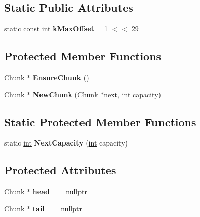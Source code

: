 \subsection*{Static Public Attributes}
\begin{DoxyCompactItemize}
\item 
\mbox{\label{classv8_1_1internal_1_1TypedSlots_a0707d5403da240a6561a9262a7785c83}} 
static const \mbox{\hyperlink{classint}{int}} {\bfseries k\+Max\+Offset} = 1 $<$$<$ 29
\end{DoxyCompactItemize}
\subsection*{Protected Member Functions}
\begin{DoxyCompactItemize}
\item 
\mbox{\label{classv8_1_1internal_1_1TypedSlots_a3460f69c60dd820a369d3e21d64aad7f}} 
\mbox{\hyperlink{structv8_1_1internal_1_1TypedSlots_1_1Chunk}{Chunk}} $\ast$ {\bfseries Ensure\+Chunk} ()
\item 
\mbox{\label{classv8_1_1internal_1_1TypedSlots_a4ea2efaab7a683e331462fc462c53a97}} 
\mbox{\hyperlink{structv8_1_1internal_1_1TypedSlots_1_1Chunk}{Chunk}} $\ast$ {\bfseries New\+Chunk} (\mbox{\hyperlink{structv8_1_1internal_1_1TypedSlots_1_1Chunk}{Chunk}} $\ast$next, \mbox{\hyperlink{classint}{int}} capacity)
\end{DoxyCompactItemize}
\subsection*{Static Protected Member Functions}
\begin{DoxyCompactItemize}
\item 
\mbox{\label{classv8_1_1internal_1_1TypedSlots_ae546e09e8382746f338b8209b66aa9e0}} 
static \mbox{\hyperlink{classint}{int}} {\bfseries Next\+Capacity} (\mbox{\hyperlink{classint}{int}} capacity)
\end{DoxyCompactItemize}
\subsection*{Protected Attributes}
\begin{DoxyCompactItemize}
\item 
\mbox{\label{classv8_1_1internal_1_1TypedSlots_a4b2107b4989c8d44f89182841e43372a}} 
\mbox{\hyperlink{structv8_1_1internal_1_1TypedSlots_1_1Chunk}{Chunk}} $\ast$ {\bfseries head\+\_\+} = nullptr
\item 
\mbox{\label{classv8_1_1internal_1_1TypedSlots_a743350a92713ee2b125cb813d51887a8}} 
\mbox{\hyperlink{structv8_1_1internal_1_1TypedSlots_1_1Chunk}{Chunk}} $\ast$ {\bfseries tail\+\_\+} = nullptr
\end{DoxyCompactItemize}
